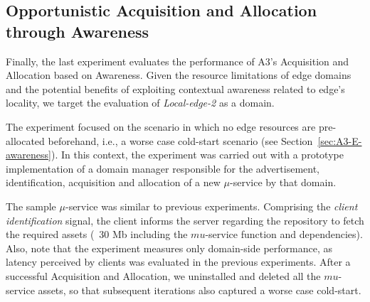 


\subsection{Opportunistic Acquisition and Allocation through Awareness}

Finally, the last experiment evaluates the performance of A3's Acquisition and Allocation based on Awareness. Given the resource limitations of edge domains and the potential benefits of exploiting contextual awareness related to edge's locality, we target the evaluation of \textit{Local-edge-2} as a domain. 

The experiment focused on the scenario in which no edge resources are pre-allocated beforehand, i.e., a worse case cold-start scenario (see Section~\ref{sec:A3-E-awareness}). In this context, the experiment was carried out with a prototype implementation of a domain manager responsible for the advertisement, identification, acquisition and allocation of a new $\mu$-service by that domain.


The sample $\mu$-service was similar to previous experiments. Comprising the \textit{client identification} signal, the client informs the server regarding the repository to fetch the required assets (~30 Mb including the $mu$-service function and dependencies).
Also, note that the experiment measures only domain-side performance, as latency perceived by clients was evaluated in the previous experiments. After a successful Acquisition and Allocation, we uninstalled and deleted all the $mu$-service assets, so that subsequent iterations also captured a worse case cold-start.

